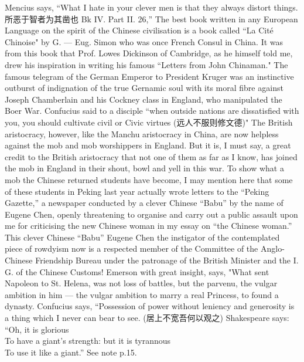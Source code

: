 
\begin{thebibliography}{30}
     Mencius says, ``What I hate in your clever men is that they always distort things. 所恶于智者为其凿也 Bk IV. Part II. 26,''
     The best book written in any European Language on the spirit of the Chinese civilisation is a book called ``La Cit\'e Chinoise" by G. --- Eug. Simon who was once French Consul in China. It was from this book that Prof. Lowes Dickinson of Cambridge, as he himself told me, drew his inspiration in writing his famous ``Letters from John Chinaman."
     The famous telegram of the German Emperor to President Kruger was an instinctive outburst of indignation of the true Gernamic soul with its moral fibre against Joseph Chamberlain and his Cockney class in England, who manipulated the Boer War.
     Confucius said to a disciple ``when outside nations are dissatisfied with you, you should cultivate civil or Civic virtues (远人不服则修文德)" The British aristocracy, however, like the Manchu aristocracy in China, are now helpless against the mob and mob worshippers in England. But it is, I must say, a great credit to the British aristocracy that not one of them as far as I know, has joined the mob in England in their shout, bowl and yell in this war.
     To show what a mob the Chinese returned students have become, I may mention here that some of these students in Peking last year actually wrote letters to the ``Peking Gazette,'' a newspaper conducted by a clever Chinese ``Babu'' by the name of Eugene Chen, openly threatening to organise and carry out a public assault upon me for criticising the new Chinese woman in my essay on ``the Chinese woman.'' This clever Chinese ``Babu'' Eugene Chen the instigator of the contemplated piece of rowdyism now is a respected member of the Committee of the Anglo-Chinese Friendship Bureau under the patronage of the British Minister and the I. G. of the Chinese Customs!
     Emerson with great insight, says, "What sent Napoleon to St. Helena, was not loss of battles, but the parvenu, the vulgar ambition in him --- the vulgar ambition to marry a real Princess, to found a dynasty.
     Confucius says, ``Possession of power without leniency and generosity is a thing which I never can bear to see. (居上不宽吾何以观之) Shakespeare says: \\``Oh, it is glorious\\ To have a giant's strength: but it is tyrannous \\ To use it like a giant.'' See note p.15.

\end{thebibliography}
